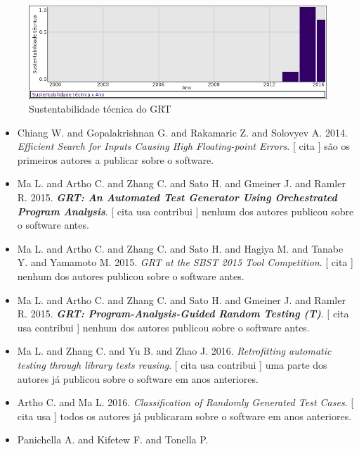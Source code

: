\begin{figure}[h]
  \center
  \includegraphics[scale=0.50]{imagens/softwares-charts/grt.png}
  \caption{Sustentabilidade técnica do GRT}
\end{figure}


\begin{itemize}
\item Chiang W. and Gopalakrishnan G. and Rakamaric Z. and Solovyev A.
      2014.
        \textit{ Efficient Search for Inputs Causing High Floating-point Errors}.
      [
          cita
      ]
são os primeiros autores a publicar sobre o software.
\item Ma L. and Artho C. and Zhang C. and Sato H. and Gmeiner J. and Ramler R.
      2015.
        \textbf{\textit{ GRT: An Automated Test Generator Using Orchestrated Program Analysis}}.
      [
          cita
          usa
          contribui
      ]
nenhum dos autores publicou sobre o software antes.
\item Ma L. and Artho C. and Zhang C. and Sato H. and Hagiya M. and Tanabe Y. and Yamamoto M.
      2015.
        \textit{ GRT at the SBST 2015 Tool Competition}.
      [
          cita
      ]
nenhum dos autores publicou sobre o software antes.
\item Ma L. and Artho C. and Zhang C. and Sato H. and Gmeiner J. and Ramler R.
      2015.
        \textbf{\textit{ GRT: Program-Analysis-Guided Random Testing (T)}}.
      [
          cita
          usa
          contribui
      ]
nenhum dos autores publicou sobre o software antes.
\item Ma L. and Zhang C. and Yu B. and Zhao J.
      2016.
        \textit{ Retrofitting automatic testing through library tests reusing}.
      [
          cita
          usa
          contribui
      ]
uma parte dos autores já publicou sobre o software em anos anteriores.
\item Artho C. and Ma L.
      2016.
        \textit{ Classification of Randomly Generated Test Cases}.
      [
          cita
          usa
      ]
todos os autores já publicaram sobre o software em anos anteriores.
\item Panichella A. and Kifetew F. and Tonella P.

\end{itemize}
